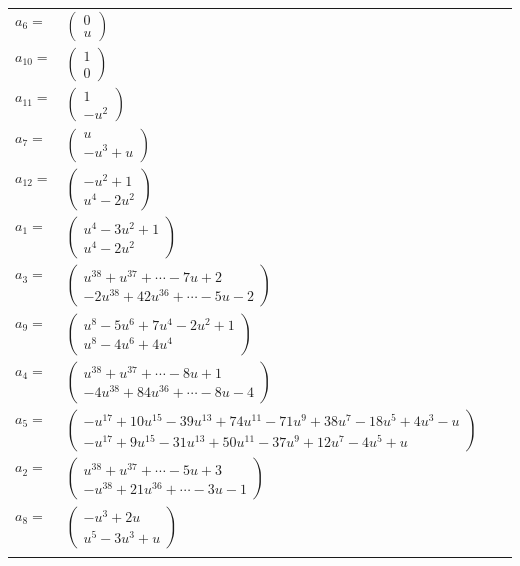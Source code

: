 \documentclass[1p]{elsarticle_modified}
\theoremstyle{definition}
\begin{document}
\begin{tabular}{m{7pt} m{180pt} m{7pt} m{180pt} }
\flushright $a_{6}=$&$\begin{pmatrix}0\\u\end{pmatrix}$ \\
\flushright $a_{10}=$&$\begin{pmatrix}1\\0\end{pmatrix}$ \\
\flushright $a_{11}=$&$\begin{pmatrix}1\\- u^2\end{pmatrix}$ \\
\flushright $a_{7}=$&$\begin{pmatrix}u\\- u^3+u\end{pmatrix}$ \\
\flushright $a_{12}=$&$\begin{pmatrix}- u^2+1\\u^4-2 u^2\end{pmatrix}$ \\
\flushright $a_{1}=$&$\begin{pmatrix}u^4-3 u^2+1\\u^4-2 u^2\end{pmatrix}$ \\
\flushright $a_{3}=$&$\begin{pmatrix}u^{38}+u^{37}+\cdots-7 u+2\\-2 u^{38}+42 u^{36}+\cdots-5 u-2\end{pmatrix}$ \\
\flushright $a_{9}=$&$\begin{pmatrix}u^8-5 u^6+7 u^4-2 u^2+1\\u^8-4 u^6+4 u^4\end{pmatrix}$ \\
\flushright $a_{4}=$&$\begin{pmatrix}u^{38}+u^{37}+\cdots-8 u+1\\-4 u^{38}+84 u^{36}+\cdots-8 u-4\end{pmatrix}$ \\
\flushright $a_{5}=$&$\begin{pmatrix}- u^{17}+10 u^{15}-39 u^{13}+74 u^{11}-71 u^9+38 u^7-18 u^5+4 u^3- u\\- u^{17}+9 u^{15}-31 u^{13}+50 u^{11}-37 u^9+12 u^7-4 u^5+u\end{pmatrix}$ \\
\flushright $a_{2}=$&$\begin{pmatrix}u^{38}+u^{37}+\cdots-5 u+3\\- u^{38}+21 u^{36}+\cdots-3 u-1\end{pmatrix}$ \\
\flushright $a_{8}=$&$\begin{pmatrix}- u^3+2 u\\u^5-3 u^3+u\end{pmatrix}$\\&\end{tabular}
\end{document}

